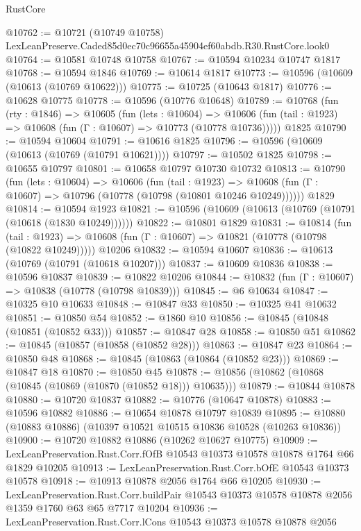 \begin{lexlean}{RustCore}
\begin{coremodule}
@10762 := @10721
    (@10749 @10758)
    LexLeanPreserve.Caded85d0ec70c96655a45904ef60abdb.R30.RustCore.look0
@10764 := @10581 @10748 @10758
@10767 := @10594 @10234 @10747 @1817
@10768 := @10594 @1846
@10769 := @10614 @1817
@10773 := @10596 (@10609 (@10613 (@10769 @10622)))
@10775 := @10725 (@10643 @1817)
@10776 := @10628 @10775
@10778 := @10596 (@10776 @10648)
@10789 := @10768
    (fun (rty : @1846) =>
    @10605
      (fun (lets : @10604) =>
      @10606 (fun (tail : @1923) => @10608 (fun (Γ : @10607) => @10773 (@10778 @10736)))))
    @1825
@10790 := @10594 @10604
@10791 := @10616 @1825
@10796 := @10596 (@10609 (@10613 (@10769 (@10791 @10621))))
@10797 := @10502 @1825
@10798 := @10655 @10797
@10801 := @10658 @10797 @10730 @10732
@10813 := @10790
    (fun (lets : @10604) =>
    @10606
      (fun (tail : @1923) =>
      @10608 (fun (Γ : @10607) => @10796 (@10778 (@10798 (@10801 @10246 @10249))))))
    @1829
@10814 := @10594 @1923
@10821 := @10596 (@10609 (@10613 (@10769 (@10791 (@10618 (@1830 @10249))))))
@10822 := @10801 @1829
@10831 := @10814
    (fun (tail : @1923) => @10608 (fun (Γ : @10607) => @10821 (@10778 (@10798 (@10822 @10249)))))
    @10206
@10832 := @10594 @10607
@10836 := @10613 (@10769 (@10791 (@10618 @10207)))
@10837 := @10609 @10836
@10838 := @10596 @10837
@10839 := @10822 @10206
@10844 := @10832 (fun (Γ : @10607) => @10838 (@10778 (@10798 @10839)))
@10845 := @6 @10634
@10847 := @10325 @10 @10633
@10848 := @10847 @33
@10850 := @10325 @41 @10632
@10851 := @10850 @54
@10852 := @1860 @10
@10856 := @10845 (@10848 (@10851 (@10852 @33)))
@10857 := @10847 @28
@10858 := @10850 @51
@10862 := @10845 (@10857 (@10858 (@10852 @28)))
@10863 := @10847 @23
@10864 := @10850 @48
@10868 := @10845 (@10863 (@10864 (@10852 @23)))
@10869 := @10847 @18
@10870 := @10850 @45
@10878 := @10856 (@10862 (@10868 (@10845 (@10869 (@10870 (@10852 @18))) @10635)))
@10879 := @10844 @10878
@10880 := @10720 @10837
@10882 := @10776 (@10647 @10878)
@10883 := @10596 @10882
@10886 := @10654 @10878 @10797 @10839
@10895 := @10880 (@10883 @10886) (@10397 @10521 @10515 @10836 @10528 (@10263 @10836))
@10900 := @10720 @10882 @10886 (@10262 @10627 @10775)
@10909 := LexLeanPreservation.Rust.Corr.fOfB @10543 @10373 @10578 @10878 @1764 @66 @1829 @10205
@10913 := LexLeanPreservation.Rust.Corr.bOfE @10543 @10373 @10578
@10918 := @10913 @10878 @2056 @1764 @66 @10205
@10930 := LexLeanPreservation.Rust.Corr.buildPair
    @10543
    @10373
    @10578
    @10878
    @2056
    @1359
    @1760
    @63
    @65
    @7717
    @10204
@10936 := LexLeanPreservation.Rust.Corr.lCons @10543 @10373 @10578 @10878 @2056

\end{coremodule}
\end{lexlean}
